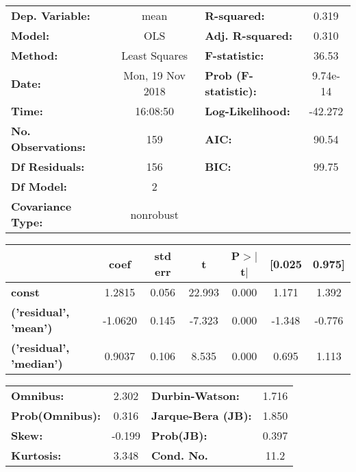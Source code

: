 \begin{center}
\begin{tabular}{lclc}
\toprule
\textbf{Dep. Variable:}    &       mean       & \textbf{  R-squared:         } &    0.319  \\
\textbf{Model:}            &       OLS        & \textbf{  Adj. R-squared:    } &    0.310  \\
\textbf{Method:}           &  Least Squares   & \textbf{  F-statistic:       } &    36.53  \\
\textbf{Date:}             & Mon, 19 Nov 2018 & \textbf{  Prob (F-statistic):} & 9.74e-14  \\
\textbf{Time:}             &     16:08:50     & \textbf{  Log-Likelihood:    } &  -42.272  \\
\textbf{No. Observations:} &         159      & \textbf{  AIC:               } &    90.54  \\
\textbf{Df Residuals:}     &         156      & \textbf{  BIC:               } &    99.75  \\
\textbf{Df Model:}         &           2      & \textbf{                     } &           \\
\textbf{Covariance Type:}  &    nonrobust     & \textbf{                     } &           \\
\bottomrule
\end{tabular}
\end{center}\begin{center}
\begin{tabular}{lcccccc}
\toprule
                                & \textbf{coef} & \textbf{std err} & \textbf{t} & \textbf{P$>$$|$t$|$} & \textbf{[0.025} & \textbf{0.975]}  \\
\midrule
\textbf{const}                  &       1.2815  &        0.056     &    22.993  &         0.000        &        1.171    &        1.392     \\
\textbf{('residual', 'mean')}   &      -1.0620  &        0.145     &    -7.323  &         0.000        &       -1.348    &       -0.776     \\
\textbf{('residual', 'median')} &       0.9037  &        0.106     &     8.535  &         0.000        &        0.695    &        1.113     \\
\bottomrule
\end{tabular}
\end{center}\begin{center}
\begin{tabular}{lclc}
\toprule
\textbf{Omnibus:}       &  2.302 & \textbf{  Durbin-Watson:     } &    1.716  \\
\textbf{Prob(Omnibus):} &  0.316 & \textbf{  Jarque-Bera (JB):  } &    1.850  \\
\textbf{Skew:}          & -0.199 & \textbf{  Prob(JB):          } &    0.397  \\
\textbf{Kurtosis:}      &  3.348 & \textbf{  Cond. No.          } &     11.2  \\
\bottomrule
\end{tabular}
\end{center}